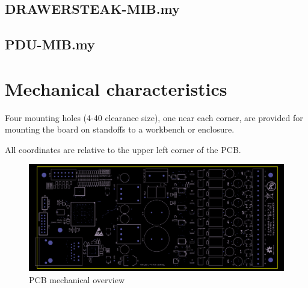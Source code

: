 \documentclass{article}
\begin{document}
\subsection{DRAWERSTEAK-MIB.my}


\subsection{PDU-MIB.my}


\pagebreak
\section{Mechanical characteristics}

Four mounting holes (4-40 clearance size), one near each corner, are provided for mounting the board on standoffs to a 
workbench or enclosure.

All coordinates are relative to the upper left corner of the PCB.

\begin{figure}[h]
\includegraphics[scale=0.19]{silk-front-small.png}
\caption{PCB mechanical overview}
\label{silk-front}
\end{figure}
\end{document}
